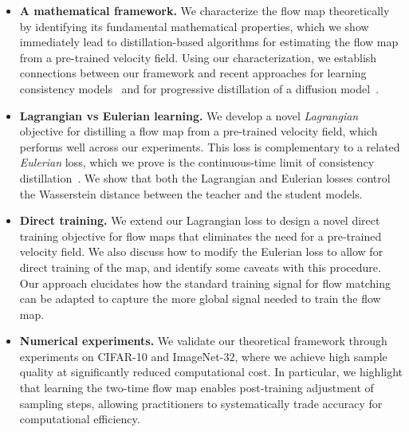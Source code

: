 \begin{itemize}[leftmargin=0.2in]
	\item \textbf{A mathematical framework.}
	      We characterize the flow map theoretically by identifying its fundamental mathematical properties, which we show immediately lead to distillation-based algorithms for estimating the flow map from a pre-trained velocity field.
	      Using our characterization, we establish connections between our framework and recent approaches for learning consistency models~\citep{song_consistency_2023, song_improved_2023, kim_consistency_2024} and for progressive distillation of a diffusion model~\citep{salimans_progressive_2022, zheng_fast_2023}.
	\item \textbf{Lagrangian vs Eulerian learning.}
	      We develop a novel \textit{Lagrangian} objective for distilling a flow map from a pre-trained velocity field, which performs well across our experiments. This loss is complementary to a related \textit{Eulerian} loss, which we prove is the continuous-time limit of consistency distillation~\citep{song_consistency_2023}. We show that both the Lagrangian and Eulerian losses control the Wasserstein distance between the teacher and the student models.
	\item \textbf{Direct training.}
	      We extend our Lagrangian loss to design a novel direct training objective for flow maps that eliminates the need for a pre-trained velocity field.
	      We also discuss how to modify the Eulerian loss to allow for direct training of the map, and identify some caveats with this procedure.
	      Our approach elucidates how the standard training signal for flow matching can be adapted to capture the more global signal needed to train the flow map.
	\item \textbf{Numerical experiments.}
	      We validate our theoretical framework through experiments on CIFAR-10 and ImageNet-$32$, where we achieve high sample quality at significantly reduced computational cost.
	      In particular, we highlight that learning the two-time flow map enables post-training adjustment of sampling steps, allowing practitioners to systematically trade accuracy for computational efficiency.
\end{itemize}
